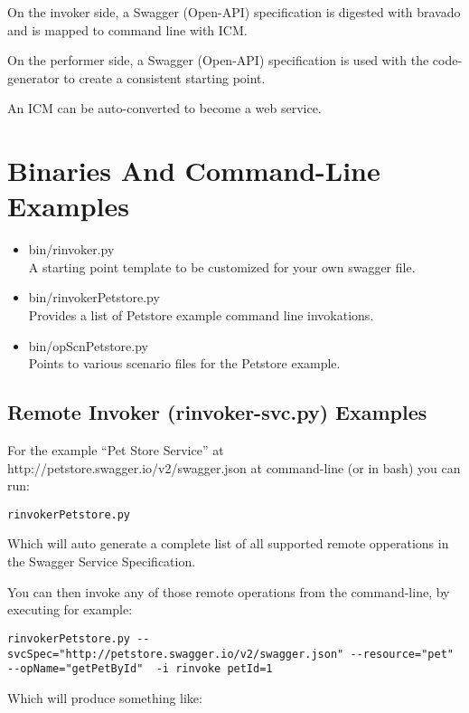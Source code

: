 \documentclass{article}
\begin{document}
On the invoker side, a Swagger (Open-API) specification is
digested with bravado and is mapped to command line with ICM.

On the performer side, a Swagger (Open-API) specification is used with
the code-generator to create a consistent starting point.

An ICM can be auto-converted to become a web service.

\section{Binaries And Command-Line Examples}

\begin{itemize}
\item bin/rinvoker.py\\
  A starting point template to be customized for your own swagger file.
\item bin/rinvokerPetstore.py\\
  Provides a list of Petstore example command line invokations.
\item bin/opScnPetstore.py\\
  Points to various scenario files for the Petstore example.
\end{itemize}

\subsection{Remote Invoker (rinvoker-svc.py) Examples}

For the example ``Pet Store Service'' at http://petstore.swagger.io/v2/swagger.json
at command-line (or in bash) you can run: 

\begin{verbatim}
rinvokerPetstore.py
\end{verbatim}

Which will auto generate a complete list of all supported remote opperations 
in the Swagger Service Specification.

You can then invoke any of those remote operations from the command-line, by executing for example:
 
\begin{verbatim}
rinvokerPetstore.py --svcSpec="http://petstore.swagger.io/v2/swagger.json" --resource="pet" --opName="getPetById"  -i rinvoke petId=1
\end{verbatim}

Which will produce something like:
\end{document}
